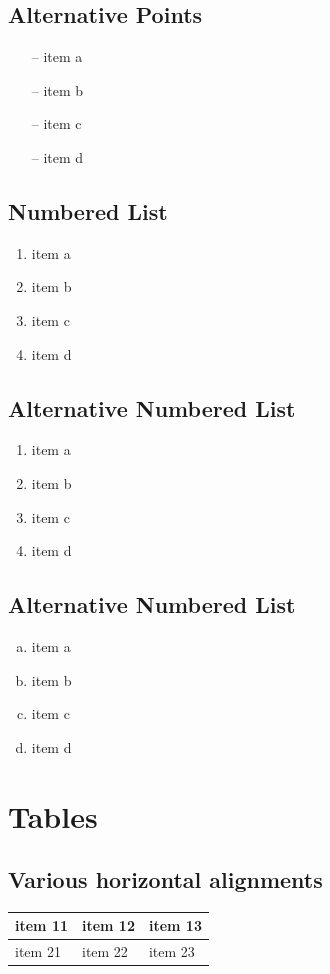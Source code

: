 \documentclass[12pt]{article}
\begin{document}
\subsection*{Alternative Points}
\begin{itemize}
\item[--] item a
\item[--] item b
\item[--] item c
\item[--] item d
\end{itemize}

\subsection*{Numbered List}
\begin{enumerate}
\item item a
\item item b
\item item c
\item item d
\end{enumerate}

\subsection*{Alternative Numbered List}
\begin{enumerate}[I]
\item item a
\item item b
\item item c
\item item d
\end{enumerate}

\subsection*{Alternative Numbered List}
\begin{enumerate}[a.]
\item item a
\item item b
\item item c
\item item d
\end{enumerate}

\section{Tables}
\subsection{Various horizontal alignments}
\begin{tabularx}{0.8\textwidth} {
  | >{\raggedright\arraybackslash}X
  | >{\centering\arraybackslash}X
  | >{\raggedleft\arraybackslash}X | }
 \hline
 item 11 & item 12 & item 13 \\
 \hline
 item 21  & item 22  & item 23  \\
\hline
\end{tabularx}
\end{document}
